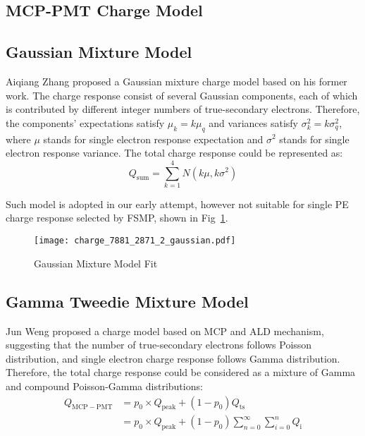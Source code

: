 \begin{survey}
\section{MCP-PMT Charge Model}
\subsection{Gaussian Mixture Model}
Aiqiang Zhang proposed a Gaussian mixture charge model based on his former work\cite{Zhang2023Oct}.
The charge response consist of several Gaussian components, 
each of which is contributed by different integer numbers of true-secondary electrons.
Therefore, the components' expectations satisfy $\mu_k=k\mu_q$ and variances satisfy $\sigma_k^2=k\sigma_q^2$,
where $\mu$ stands for single electron response expectation and $\sigma^2$ stands for single electron response variance.
The total charge response could be represented as:
\begin{equation}
    Q_{\text{sum}} = \sum\limits_{k=1}^{4} N(k\mu, k\sigma^2)
\end{equation}

Such model is adopted in our early attempt, however not suitable for single PE charge response selected by FSMP, shown in Fig~\ref{fig:gauss-mixture}.
\begin{figure}[ht]
    \centering
    \texttt{[image: charge\_7881\_2871\_2\_gaussian.pdf]}
    \caption{Gaussian Mixture Model Fit}
    \label{fig:gauss-mixture}
\end{figure}

\subsection{Gamma Tweedie Mixture Model}
Jun Weng proposed a charge model based on MCP and ALD mechanism, suggesting that
the number of true-secondary electrons follows Poisson distribution, 
and single electron charge response follows Gamma distribution.
Therefore, the total charge response could be considered as a mixture of
Gamma and compound Poisson-Gamma distributions\cite{wengSingleElectronCharge2024}:
\begin{equation}\label{eq:mixture}
    \begin{aligned}
        Q_{\mathrm{MCP-PMT}}& =p_{0}\times Q_{\mathrm{peak}}+(1-p_{0})Q_{\mathrm{ts}} \\
        &=p_{0}\times Q_{\mathrm{peak}}+(1-p_{0})\sum_{n=0}^{\infty}\sum_{i=0}^{n}Q_{\mathrm{i}}
    \end{aligned}
\end{equation}


\end{survey}

